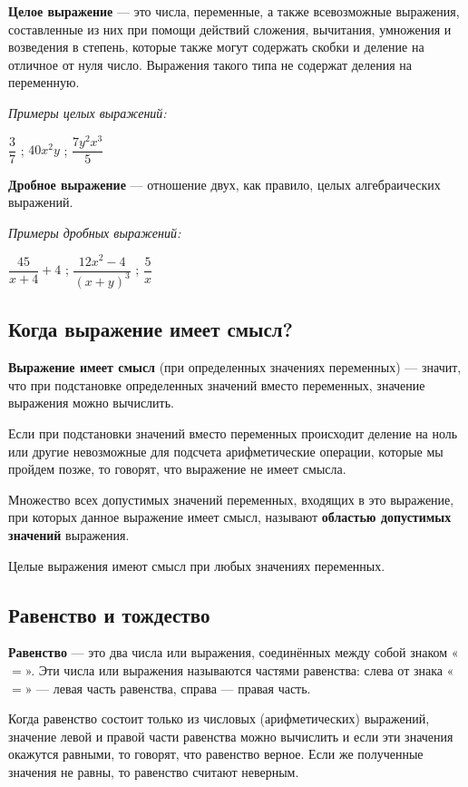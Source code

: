 \documentclass[12pt, a4paper]{article}
\begin{document}
	\textbf{Целое выражение} — это числа, переменные, а также всевозможные выражения, составленные из них при помощи действий сложения, вычитания, умножения и возведения в степень, которые также могут содержать скобки и деление на отличное от нуля число. Выражения такого типа не содержат деления на переменную.
	
	\textit{Примеры целых выражений:}
	\begin{center}
		$\dfrac{3}{7}$ ; $40x^2y$ ; $\dfrac{7y^2x^3}{5}$
	\end{center}

	\textbf{Дробное выражение} — отношение двух, как правило, целых алгебраических выражений.
	
	\textit{Примеры дробных выражений:}
	\begin{center}
		$\dfrac{45}{x+4}+4$ ; $\dfrac{12x^2-4}{(x+y)^3}$ ; $\dfrac{5}{x}$
	\end{center}
	
	\subsection*{Когда выражение имеет смысл?}
	
	\textbf{Выражение имеет смысл} (при определенных значениях переменных) — значит, что при подстановке определенных значений вместо переменных, значение выражения можно вычислить.
	
	Если при подстановки значений вместо переменных происходит деление на ноль или другие невозможные для подсчета арифметические операции, которые мы пройдем позже, то говорят, что выражение не имеет смысла.
	
	Множество всех допустимых значений переменных, входящих в это выражение, при которых данное выражение имеет смысл, называют \textbf{областью допустимых значений} выражения.
	
	Целые выражения имеют смысл при любых значениях переменных.
	
	\subsection*{Равенство и тождество}
	
	\textbf{Равенство} — это два числа или выражения, соединённых между собой знаком «$=$». Эти числа или выражения называются частями равенства: слева от знака «$=$» — левая часть равенства, справа — правая часть.
	
	Когда равенство состоит только из числовых (арифметических) выражений, значение левой и правой части равенства можно вычислить и если эти значения окажутся равными, то говорят, что равенство верное. Если же полученные значения не равны, то равенство считают неверным.
	
\end{document}
